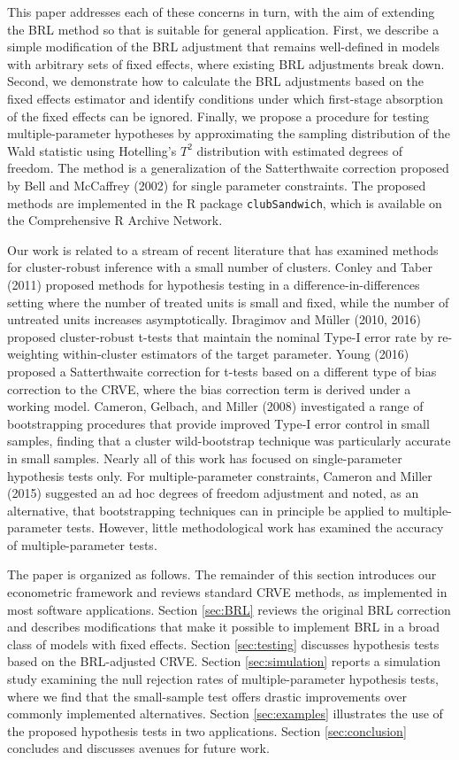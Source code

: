 \documentclass[12pt]{article}
\begin{document}
This paper addresses each of these concerns in turn, with the aim of
extending the BRL method so that is suitable for general application.
First, we describe a simple modification of the BRL adjustment that
remains well-defined in models with arbitrary sets of fixed effects,
where existing BRL adjustments break down. Second, we demonstrate how to
calculate the BRL adjustments based on the fixed effects estimator and
identify conditions under which first-stage absorption of the fixed
effects can be ignored. Finally, we propose a procedure for testing
multiple-parameter hypotheses by approximating the sampling distribution
of the Wald statistic using Hotelling's \(T^2\) distribution with
estimated degrees of freedom. The method is a generalization of the
Satterthwaite correction proposed by Bell and McCaffrey (2002) for
single parameter constraints. The proposed methods are implemented in
the R package \texttt{clubSandwich}, which is available on the
Comprehensive R Archive Network.

Our work is related to a stream of recent literature that has examined
methods for cluster-robust inference with a small number of clusters.
Conley and Taber (2011) proposed methods for hypothesis testing in a
difference-in-differences setting where the number of treated units is
small and fixed, while the number of untreated units increases
asymptotically. Ibragimov and Müller (2010, 2016) proposed
cluster-robust t-tests that maintain the nominal Type-I error rate by
re-weighting within-cluster estimators of the target parameter. Young
(2016) proposed a Satterthwaite correction for t-tests based on a
different type of bias correction to the CRVE, where the bias correction
term is derived under a working model. Cameron, Gelbach, and Miller
(2008) investigated a range of bootstrapping procedures that provide
improved Type-I error control in small samples, finding that a cluster
wild-bootstrap technique was particularly accurate in small samples.
Nearly all of this work has focused on single-parameter hypothesis tests
only. For multiple-parameter constraints, Cameron and Miller (2015)
suggested an ad hoc degrees of freedom adjustment and noted, as an
alternative, that bootstrapping techniques can in principle be applied
to multiple-parameter tests. However, little methodological work has
examined the accuracy of multiple-parameter tests.

The paper is organized as follows. The remainder of this section
introduces our econometric framework and reviews standard CRVE methods,
as implemented in most software applications. Section \ref{sec:BRL}
reviews the original BRL correction and describes modifications that
make it possible to implement BRL in a broad class of models with fixed
effects. Section \ref{sec:testing} discusses hypothesis tests based on
the BRL-adjusted CRVE. Section \ref{sec:simulation} reports a simulation
study examining the null rejection rates of multiple-parameter
hypothesis tests, where we find that the small-sample test offers
drastic improvements over commonly implemented alternatives. Section
\ref{sec:examples} illustrates the use of the proposed hypothesis tests
in two applications. Section \ref{sec:conclusion} concludes and
discusses avenues for future work.
\end{document}
